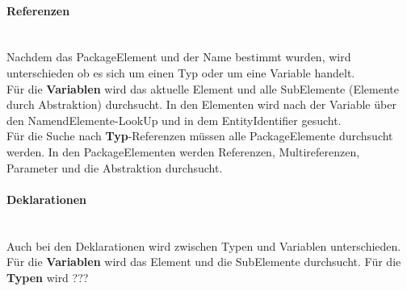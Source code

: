 \documentclass[./einleitung.tex]{subfiles}
\begin{document}
    \paragraph{Referenzen}\mbox{}\\
    Nachdem das PackageElement und der Name bestimmt wurden, wird unterschieden ob es sich um einen Typ oder um eine Variable handelt.
    \\
    Für die \textbf{Variablen} wird das aktuelle Element und alle SubElemente (Elemente durch Abstraktion) durchsucht.
    In den Elementen wird nach der Variable über den NamendElemente-LookUp und in dem EntityIdentifier gesucht.
    \\
    Für die Suche nach \textbf{Typ}-Referenzen müssen alle PackageElemente durchsucht werden.
    In den PackageElementen werden Referenzen, Multireferenzen, Parameter und die Abstraktion durchsucht.

    \paragraph{Deklarationen}\mbox{}\\
    Auch bei den Deklarationen wird zwischen Typen und Variablen unterschieden. \\
    Für die \textbf{Variablen} wird das Element und die SubElemente durchsucht.
        Für die \textbf{Typen} wird ???
\end{document}
